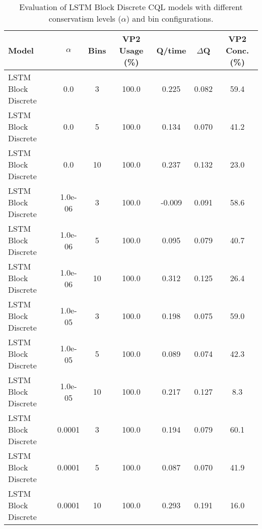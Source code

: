 \begin{table}[ht]
\centering
\caption{Evaluation of LSTM Block Discrete CQL models with different conservatism levels ($\alpha$) and bin configurations.}
\label{tab:lstm_cql_evaluation}
\begin{tabular}{lcccccc}
\toprule
Model & $\alpha$ & Bins & VP2 Usage (\%) & Q/time & $\Delta$Q & VP2 Conc. (\%) \\
\midrule
LSTM Block Discrete & 0.0 & 3 & 100.0 & 0.225 & 0.082 & 59.4 \\
LSTM Block Discrete & 0.0 & 5 & 100.0 & 0.134 & 0.070 & 41.2 \\
LSTM Block Discrete & 0.0 & 10 & 100.0 & 0.237 & 0.132 & 23.0 \\
LSTM Block Discrete & 1.0e-06 & 3 & 100.0 & -0.009 & 0.091 & 58.6 \\
LSTM Block Discrete & 1.0e-06 & 5 & 100.0 & 0.095 & 0.079 & 40.7 \\
LSTM Block Discrete & 1.0e-06 & 10 & 100.0 & 0.312 & 0.125 & 26.4 \\
LSTM Block Discrete & 1.0e-05 & 3 & 100.0 & 0.198 & 0.075 & 59.0 \\
LSTM Block Discrete & 1.0e-05 & 5 & 100.0 & 0.089 & 0.074 & 42.3 \\
LSTM Block Discrete & 1.0e-05 & 10 & 100.0 & 0.217 & 0.127 & 8.3 \\
LSTM Block Discrete & 0.0001 & 3 & 100.0 & 0.194 & 0.079 & 60.1 \\
LSTM Block Discrete & 0.0001 & 5 & 100.0 & 0.087 & 0.070 & 41.9 \\
LSTM Block Discrete & 0.0001 & 10 & 100.0 & 0.293 & 0.191 & 16.0 \\
\bottomrule
\end{tabular}
\end{table}